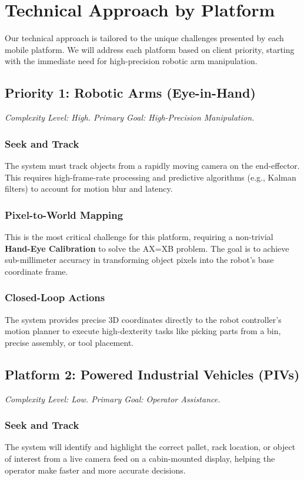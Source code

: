 \chapter{Technical Approach by Platform}
\label{chap:tech_approach}

Our technical approach is tailored to the unique challenges presented by each mobile platform. We will address each platform based on client priority, starting with the immediate need for high-precision robotic arm manipulation.

\section{Priority 1: Robotic Arms (Eye-in-Hand)}
\textit{Complexity Level: High. Primary Goal: High-Precision Manipulation.}

\subsection{Seek and Track}
The system must track objects from a rapidly moving camera on the end-effector. This requires high-frame-rate processing and predictive algorithms (e.g., Kalman filters) to account for motion blur and latency.

\subsection{Pixel-to-World Mapping}
This is the most critical challenge for this platform, requiring a non-trivial \textbf{Hand-Eye Calibration} to solve the AX=XB problem. The goal is to achieve sub-millimeter accuracy in transforming object pixels into the robot's base coordinate frame.

\subsection{Closed-Loop Actions}
The system provides precise 3D coordinates directly to the robot controller's motion planner to execute high-dexterity tasks like picking parts from a bin, precise assembly, or tool placement.

\section{Platform 2: Powered Industrial Vehicles (PIVs)}
\textit{Complexity Level: Low. Primary Goal: Operator Assistance.}

\subsection{Seek and Track}
The system will identify and highlight the correct pallet, rack location, or object of interest from a live camera feed on a cabin-mounted display, helping the operator make faster and more accurate decisions.

